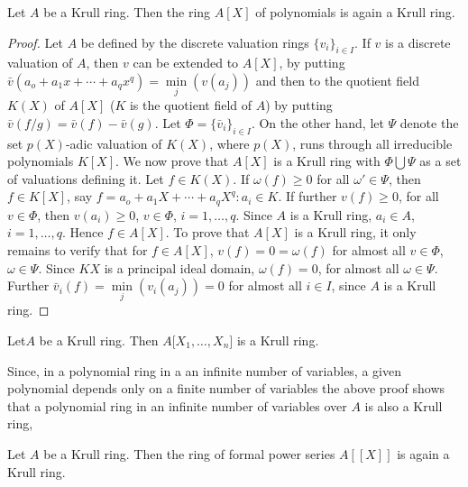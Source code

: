 \begin{prop} %
Let $A$ be a Krull ring. Then the ring $A[X]$ of polynomials is again
a Krull ring. 
\end{prop}  
  
\begin{proof}
Let $A$ be defined by the discrete valuation rings $\big\{v_i\big\}_{i
  \in I}$. If $v$ is a discrete valuation of $A$, then $v$ can be
extended to $A[X]$, by putting $\bar{v} (a_o + a_1 x + \cdots + a_q
x^q) = \min\limits_{j}(v(a_j))$ and then to the quotient field $K(X)$
of $A[X]$ ($K$ is the quotient field of $A$) by putting $\bar{v}(f/g) =
\bar{v}(f) - \bar{v}(g)$.  Let $\Phi = \big \{  \bar{v}_i \big\}_{i
  \in I}$. On the other hand, let $\Psi$ denote the set $p(X)$-adic
valuation of $K(X)$, where $p(X)$, runs through all irreducible
polynomials $K[X]$. We now prove that $A[X]$ is a Krull ring with
$\Phi \bigcup \Psi$ as a set of valuations defining it. Let $f \in
K(X)$. If $\omega (f) \ge 0$ for all $\omega' \in \Psi$, then $f \in
K[X]$, say $f = a_o + a_1 X + \cdots + a_q X^q : a_i \in K$. If further
$v(f) \ge 0$, for all $v \in \Phi$, then $v(a_i) \ge 0$, $v \in \Phi$, $i
= 1, \ldots , q$. Since $A$ is a Krull ring, $a_i \in A$, $i =
1, \ldots , q$. Hence $f \in A [X]$. To prove that $A [X]$ is a Krull
ring, it only remains to verify that for $f \in A [X]$,  $v(f)= 0 =
\omega (f)$ for almost all $v \in \Phi$, $\omega \in \Psi$. Since $K 
X$ is a principal ideal domain, $\omega(f) = 0$, for almost all
$\omega \in \Psi$. Further $\bar{v}_i (f) = \min\limits_{j}(v_i (a_j))
= 0$ for almost all $i \in I$, since $A$ is a Krull ring. 
\end{proof}  
  
\begin{coro*} %
Let\pageoriginale $A$ be a Krull ring. Then $A \big[ X_1 , \ldots ,
  X_n \big]$ is a Krull ring.  
\end{coro*}  
  
\begin{remark*} %
Since, in a polynomial ring in a an infinite number of variables, a
given polynomial depends only on a finite number of  variables the
above proof shows that a polynomial ring in an infinite number of
variables over $A$ is also a Krull ring, 
\end{remark*} 
   
\begin{prop} %
Let $A$ be a Krull ring. Then the ring of formal power series $A
  [[X]]$ is again a Krull ring. 
\end{prop}  
  
